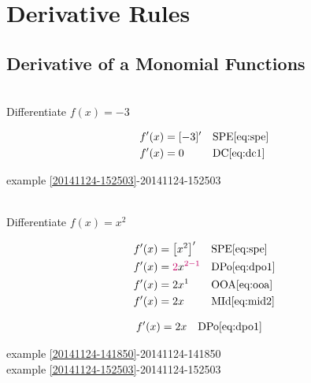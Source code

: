 \documentclass[20150903-160354-rs2.2-MarksMathNotebook.tex]{subfiles}
\begin{document}
%
%

\chapter{Derivative Rules}

\section{Derivative of a Monomial Functions}

\begin{example}[id:20141124-153017] \label{20141124-153017} \hfill \\

Differentiate $f(x)=-3$

\soln

\solnsteps
\begin{align*}
f'(x) &= [-3]' && \text{SPE} \eqref{eq:spe} \\
f'(x) &= 0 && \text{DC} \eqref{eq:dc1}
\end{align*}

\qdepend

\qdependlist

example \ref{20141124-152503}-20141124-152503

\end{example}


\begin{example}[id:20141124-141850] \label{20141124-141850} \hfill \\

Differentiate $f(x)=x^2$

\soln

\solnsteps
\begin{align*}
f'(x) &= \left[x^2\right]' && \text{SPE} \eqref{eq:spe} \\
f'(x) &= \cRed{2}x^{\cRed{2-1}} && \text{DPo} \eqref{eq:dpo1} \\
f'(x) &= 2x^1 && \text{OOA} \eqref{eq:ooa} \\
f'(x) &= 2x && \text{MId} \eqref{eq:mid2}
\end{align*}

\soln

\lesssteps
\begin{align*}
f'(x) & = 2x && \text{DPo} \eqref{eq:dpo1}
\end{align*}

\qdepend

\qdependlist

example \ref{20141124-141850}-20141124-141850\\
example \ref{20141124-152503}-20141124-152503



\end{example}
\end{document}

